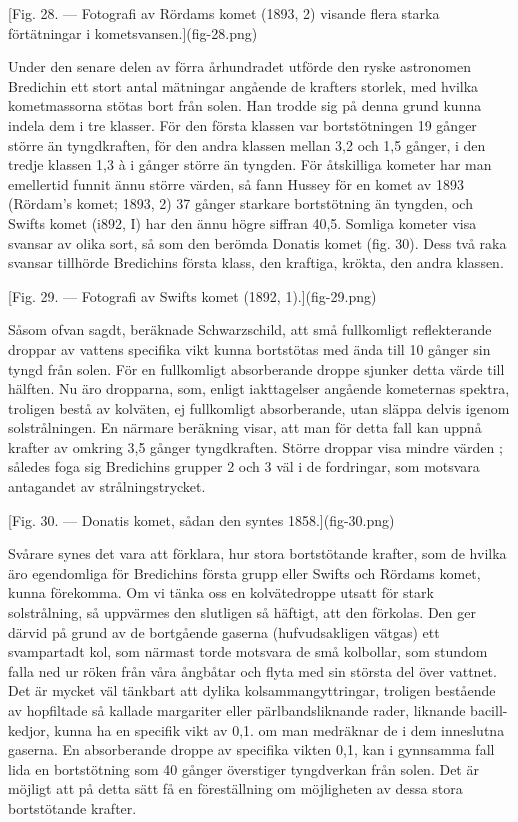 \documentclass[a4paper, 12pt, oneside, swedish]{article}
\begin{document}
[Fig. 28. --- Fotografi av Rördams komet (1893, 2) visande flera starka förtätningar i kometsvansen.](fig-28.png)

Under den senare delen av förra århundradet utförde den ryske astronomen Bredichin ett stort antal mätningar angående de krafters storlek, med hvilka kometmassorna stötas bort från solen. Han trodde sig på denna grund kunna indela dem i tre klasser. För den första klassen var bortstötningen 19 gånger större än tyngdkraften, för den andra klassen mellan 3,2 och 1,5 gånger, i den tredje klassen 1,3 à i gånger större än tyngden. För åtskilliga kometer har man emellertid funnit ännu större värden, så fann Hussey för en komet av 1893 (Rördam's komet; 1893, 2) 37 gånger starkare bortstötning än tyngden, och Swifts komet (i892, I) har den ännu högre siffran 40,5. Somliga kometer visa svansar av olika sort, så som den berömda Donatis komet (fig. 30). Dess två raka svansar tillhörde Bredichins första klass, den kraftiga, krökta, den andra klassen.

[Fig. 29. --- Fotografi av Swifts komet (1892, 1).](fig-29.png)

Såsom ofvan sagdt, beräknade Schwarzschild, att små fullkomligt reflekterande droppar av vattens specifika vikt kunna bortstötas med ända till 10 gånger sin tyngd från solen. För en fullkomligt absorberande droppe sjunker detta värde till hälften. Nu äro dropparna, som, enligt iakttagelser angående kometernas spektra, troligen bestå av kolväten, ej fullkomligt absorberande, utan släppa delvis igenom solstrålningen. En närmare beräkning visar, att man för detta fall kan uppnå krafter av omkring 3,5 gånger tyngdkraften. Större droppar visa mindre värden ; således foga sig Bredichins grupper 2 och 3 väl i de fordringar, som motsvara antagandet av strålningstrycket.

[Fig. 30. --- Donatis komet, sådan den syntes 1858.](fig-30.png)

Svårare synes det vara att förklara, hur stora bortstötande krafter, som de hvilka äro egendomliga för Bredichins första grupp eller Swifts och Rördams komet, kunna förekomma. Om vi tänka oss en kolvätedroppe utsatt för stark solstrålning, så uppvärmes den slutligen så häftigt, att den förkolas. Den ger därvid på grund av de bortgående gaserna (hufvudsakligen vätgas) ett svampartadt kol, som närmast torde motsvara de små kolbollar, som stundom falla ned ur röken från våra ångbåtar och flyta med sin största del över vattnet. Det är mycket väl tänkbart att dylika kolsammangyttringar, troligen bestående av hopfiltade så kallade margariter eller pärlbandsliknande rader, liknande bacill-kedjor, kunna ha en specifik vikt av 0,1. om man medräknar de i dem inneslutna gaserna. En absorberande droppe av specifika vikten 0,1, kan i gynnsamma fall lida en bortstötning som 40 gånger överstiger tyngdverkan från solen. Det är möjligt att på detta sätt få en föreställning om möjligheten av dessa stora bortstötande krafter.
\end{document}
